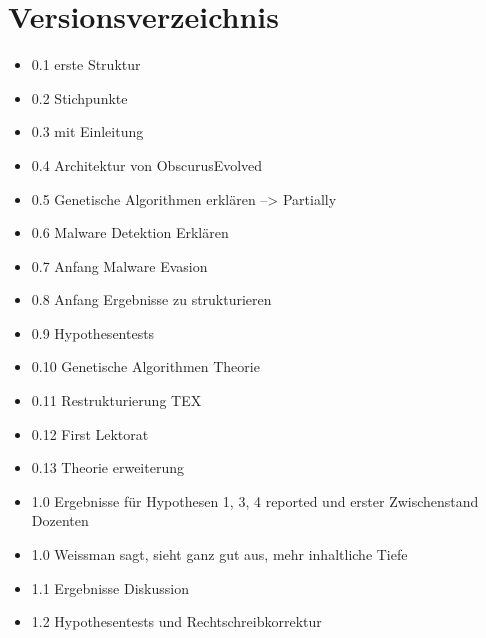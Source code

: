 \chapter{Versionsverzeichnis}
\begin{itemize}
    \item  0.1 erste Struktur
    \item 0.2 Stichpunkte
    \item 0.3 mit Einleitung
    \item 0.4 Architektur von ObscurusEvolved
    \item 0.5 Genetische Algorithmen erklären --> Partially
    \item 0.6 Malware Detektion Erklären
    \item 0.7 Anfang Malware Evasion
    \item 0.8 Anfang Ergebnisse zu strukturieren
    \item 0.9 Hypothesentests
    \item 0.10 Genetische Algorithmen Theorie
    \item 0.11 Restrukturierung TEX
    \item 0.12 First Lektorat
    \item 0.13 Theorie erweiterung
    \item 1.0 Ergebnisse für Hypothesen 1, 3, 4 reported und erster Zwischenstand Dozenten
    \item 1.0 Weissman sagt, sieht ganz gut aus, mehr inhaltliche Tiefe
    \item 1.1 Ergebnisse Diskussion
    \item 1.2 Hypothesentests und Rechtschreibkorrektur
    
\end{itemize}
